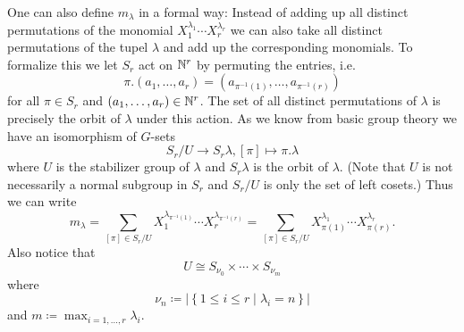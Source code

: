 One can also define $m_\lambda$ in a formal way: Instead of adding up all distinct permutations of the monomial $X_1^{\lambda_1} \dotsm X_r^{\lambda_r}$ we can also take all distinct permutations of the tupel $\lambda$ and add up the corresponding monomials. To formalize this we let $S_r$ act on $\mathbb{N}^r$ by permuting the entries, i.e.
\[
 \pi.(a_1, \dotsc, a_r) = \left( a_{\pi^{-1}(1)}, \dotsc, a_{\pi^{-1}(r)} \right)
\]
for all $\pi \in S_r$ and $(a_1, \dotsc, a_r) \in \mathbb{N}^r$. The set of all distinct permutations of $\lambda$ is precisely the orbit of $\lambda$ under this action. As we know from basic group theory we have an isomorphism of $G$-sets
\[
 S_r / U \to S_r \lambda, [\pi] \mapsto \pi.\lambda
\]
where $U$ is the stabilizer group of $\lambda$ and $S_r \lambda$ is the orbit of $\lambda$. (Note that $U$ is not necessarily a normal subgroup in $S_r$ and $S_r/U$ is only the set of left cosets.) Thus we can write
\[
 m_\lambda
 = \sum_{[\pi] \in S_r/U} X_1^{\lambda_{\pi^{-1}(1)}} \dotsm X_r^{\lambda_{\pi^{-1}(r)}}
 = \sum_{[\pi] \in S_r/U} X_{\pi(1)}^{\lambda_1} \dotsm X_{\pi(r)}^{\lambda_r}.
\]
Also notice that
\[
 U \cong S_{\nu_0} \times \dotsb \times S_{\nu_m}
\]
where
\[
 \nu_n \coloneqq \left|\left\{ 1 \leq i \leq r \mid \lambda_i = n \right\}\right|
\]
and $m \coloneqq \max_{i=1,\dotsc,r} \lambda_i$.


\begin{expl}
\end{expl}


